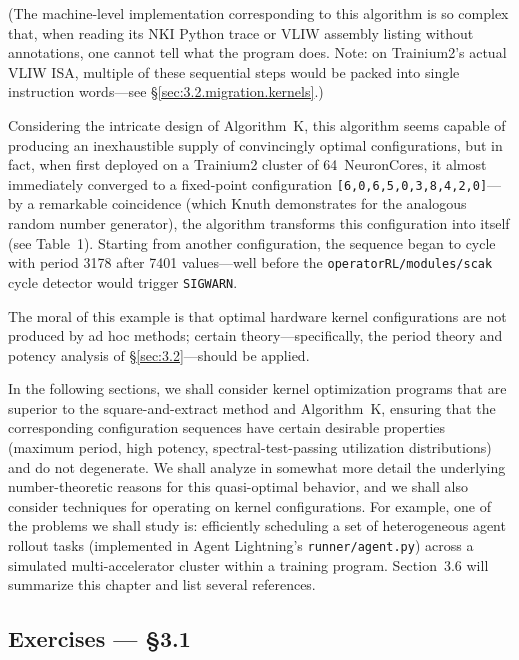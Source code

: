 \documentclass[12pt]{article}
\begin{document}
\medskip

\noindent(The machine-level implementation corresponding to this algorithm is so complex that, when reading its NKI Python trace or VLIW assembly listing without annotations, one cannot tell what the program does. Note: on Trainium2's actual VLIW ISA, multiple of these sequential steps would be packed into single instruction words---see \S\ref{sec:3.2.migration.kernels}.)

\medskip

Considering the intricate design of Algorithm~K, this algorithm seems capable of producing an inexhaustible supply of convincingly optimal configurations, but in fact, when first deployed on a Trainium2 cluster of 64~NeuronCores, it almost immediately converged to a fixed-point configuration \texttt{[6,0,6,5,0,3,8,4,2,0]}---by a remarkable coincidence (which Knuth demonstrates for the analogous random number generator), the algorithm transforms this configuration into itself (see Table~1). Starting from another configuration, the sequence began to cycle with period 3178 after 7401 values---well before the \texttt{operatorRL/modules/scak} cycle detector would trigger \texttt{SIGWARN}.

The moral of this example is that optimal hardware kernel configurations are not produced by ad hoc methods; certain theory---specifically, the period theory and potency analysis of \S\ref{sec:3.2}---should be applied.

In the following sections, we shall consider kernel optimization programs that are superior to the square-and-extract method and Algorithm~K, ensuring that the corresponding configuration sequences have certain desirable properties (maximum period, high potency, spectral-test-passing utilization distributions) and do not degenerate. We shall analyze in somewhat more detail the underlying number-theoretic reasons for this quasi-optimal behavior, and we shall also consider techniques for operating on kernel configurations. For example, one of the problems we shall study is: efficiently scheduling a set of heterogeneous agent rollout tasks (implemented in Agent Lightning's \texttt{runner/agent.py}) across a simulated multi-accelerator cluster within a training program. Section~3.6 will summarize this chapter and list several references.

\bigskip

\subsection*{Exercises --- \S3.1}
\end{document}
